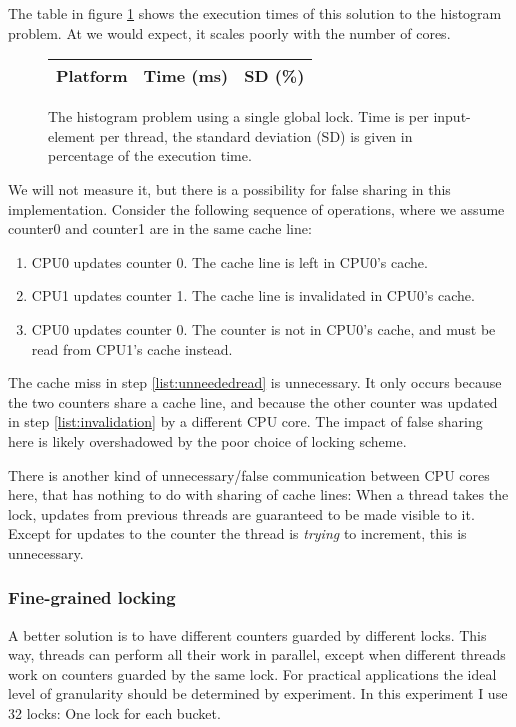 The table in figure \ref{table:histo-global} shows the execution times of this
solution to the histogram problem. At we would expect, it scales poorly with the number of cores.

\begin{figure}[hbtp]
	\centering
	\begin{tabular}{l r r}
		\hline
		\hline
		Platform & Time (ms) & SD (\%) \\
		\hline
		
		\hline
		\hline
	\end{tabular}
	\caption{The histogram problem using a single global lock. Time is per
	input-element per thread, the standard deviation (SD) is given in
	percentage of the execution time.}
	\label{table:histo-global}
\end{figure}

We will not measure it, but there is a possibility for false sharing in this
implementation. Consider the following sequence of operations, where we assume
counter0 and counter1 are in the same cache line:

\begin{enumerate}
	\item CPU0 updates counter 0. The cache line is left in CPU0's cache.
	\item \label{list:invalidation} CPU1 updates counter 1. The cache line is invalidated in CPU0's
		cache.
	\item \label{list:unneededread} CPU0 updates counter 0. The counter is not in CPU0's cache, and
		must be read from CPU1's cache instead.
\end{enumerate}

The cache miss in step \ref{list:unneededread} is unnecessary. It only occurs
because the two counters share a cache line, and because the other counter was
updated in step \ref{list:invalidation} by a different CPU core. The impact of
false sharing here is likely overshadowed by the poor choice of locking scheme.

There is another kind of unnecessary/false communication between CPU cores here,
that has nothing to do with sharing of cache lines: When a thread takes the
lock, updates from previous threads are guaranteed to be made visible to it.
Except for updates to the counter the thread is \textit{trying} to increment,
this is unnecessary.

\subsubsection{Fine-grained locking}
A better solution is to have different counters guarded by different locks. This
way, threads can perform all their work in parallel, except when different
threads work on counters guarded by the same lock. For practical applications
the ideal level of granularity should be determined by experiment. In this
experiment I use 32 locks: One lock for each bucket.

